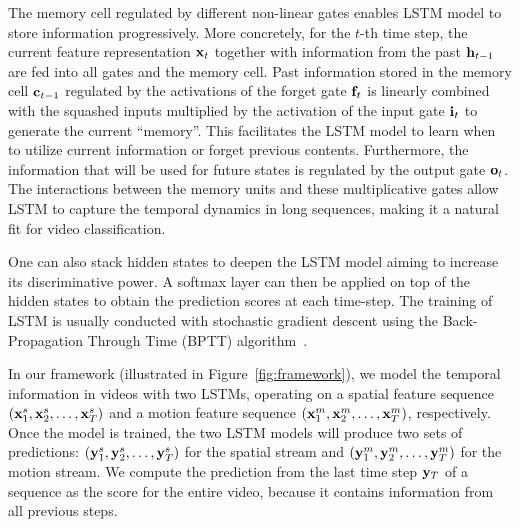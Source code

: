 \documentclass[journal]{IEEEtran}
\begin{document}
The memory cell regulated by different non-linear gates enables LSTM model to store information progressively. More concretely, for the $t$-th time step, the current feature representation ${\bf x}_t$ together with information from the past ${\bf h}_{t-1}$ are fed into all gates and the memory cell. Past information stored in the memory cell ${\bf c}_{t-1}$ regulated by the activations of the forget gate ${\bf f}_t$ is linearly combined with the squashed inputs multiplied by the activation of the input gate ${\bf i}_t$ to generate the current ``memory''. This facilitates the LSTM model to learn when to utilize current information or forget previous contents. Furthermore, the information that will be used for future states is regulated by the output gate ${\bf o}_t$. The interactions between the memory units and these multiplicative gates allow LSTM to capture
the temporal dynamics in long sequences, making it a natural fit for video classification.

One can also stack hidden states to deepen the LSTM model aiming to increase its discriminative power. A softmax layer can then be applied on top of the hidden states to obtain the prediction scores at each time-step. The training of LSTM is usually conducted with stochastic gradient descent using the Back-Propagation Through Time (BPTT) algorithm~\cite{graves2005framewise}.

In our framework (illustrated in Figure~\ref{fig:framework}), we model the temporal information in videos with two LSTMs, operating on a spatial feature sequence $({\bf x}_1^s,{\bf x}_2^s,\ldots,{\bf x}_T^s)$ and a motion feature sequence $({\bf x}_1^m,{\bf x}_2^m,\ldots,{\bf x}_T^m)$, respectively. Once the model is trained, the two LSTM models will produce two sets of predictions: $({\bf y}_1^s,{\bf y}_2^s,\ldots,{\bf y}_T^s)$ for the spatial stream and $({\bf y}_1^m,{\bf y}_2^m,\ldots,{\bf y}_T^m)$ for the motion stream. We compute the prediction from the last time step ${\bf y}_T$ of a sequence as the score for the entire video, because it contains information from all previous steps.
\end{document}
